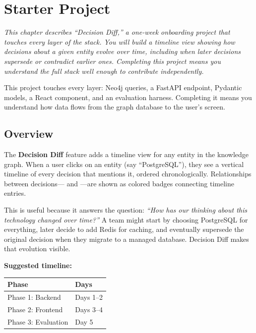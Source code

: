 \chapter{Starter Project}
\label{ch:starter-project}

\textit{This chapter describes ``Decision Diff,'' a one-week onboarding
project that touches every layer of the \sysname{} stack.  You will build
a timeline view showing how decisions about a given entity evolve over
time, including when later decisions supersede or contradict earlier ones.
Completing this project means you understand the full stack well enough to
contribute independently.}

\begin{keyinsight}
This project touches every layer: Neo4j queries, a FastAPI endpoint,
Pydantic models, a React component, and an evaluation harness.  Completing
it means you understand how data flows from the graph database to the
user's screen.
\end{keyinsight}

\section{Overview}
\label{sec:starter-overview}

The \textbf{Decision Diff} feature adds a timeline view for any entity in
the knowledge graph.  When a user clicks on an entity (say ``PostgreSQL''),
they see a vertical timeline of every decision that mentions it, ordered
chronologically.  Relationships between decisions--- and
---are shown as colored badges connecting timeline entries.

This is useful because it answers the question: \emph{``How has our
thinking about this technology changed over time?''}  A team might start by
choosing PostgreSQL for everything, later decide to add Redis for caching,
and eventually supersede the original decision when they migrate to a
managed database.  Decision Diff makes that evolution visible.

\medskip\noindent\textbf{Suggested timeline:}

\begin{table}[ht]
\centering
\begin{tabularx}{0.75\textwidth}{l X}
\toprule
\textbf{Phase} & \textbf{Days} \\
\midrule
Phase 1: Backend  & Days 1--2 \\
Phase 2: Frontend & Days 3--4 \\
Phase 3: Evaluation & Day 5 \\
\bottomrule
\end{tabularx}
\end{table}


